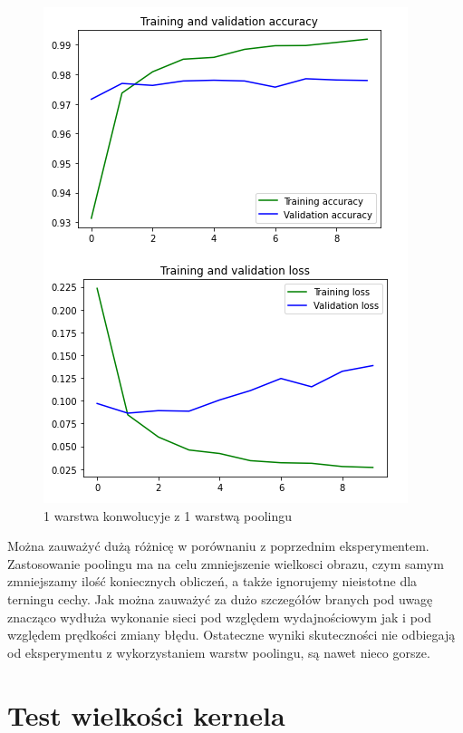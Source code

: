 \documentclass{article}
\begin{document}
\begin{figure}[!htb]
  \centering
  \includegraphics[width=\linewidth]{1_conv.png}
  \caption{1 warstwa konwolucyje z 1 warstwą poolingu}
\end{figure}

Można zauważyć dużą różnicę w porównaniu z poprzednim eksperymentem. Zastosowanie poolingu ma na celu
zmniejszenie wielkosci obrazu, czym samym zmniejszamy ilość koniecznych obliczeń, a także ignorujemy nieistotne
dla terningu cechy. Jak można zauważyć za dużo szczegółów branych pod uwagę znacząco wydłuża wykonanie sieci pod względem
wydajnościowym jak i pod względem prędkości zmiany błędu. Ostateczne wyniki skuteczności nie odbiegają od eksperymentu z wykorzystaniem warstw poolingu,
są nawet nieco gorsze.

\newpage
\section{Test wielkości kernela}
\end{document}
